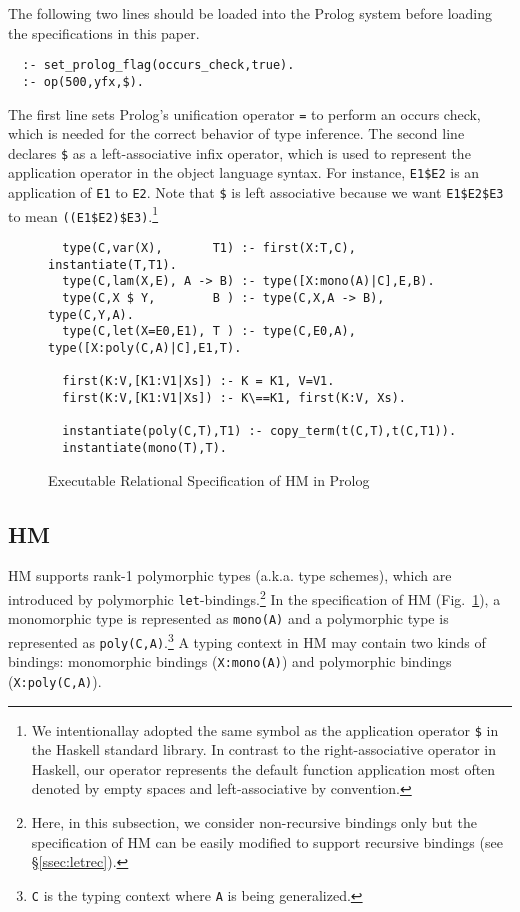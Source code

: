 \documentclass[runningheads,a4paper]{llncs}
\begin{document}
The following two lines should be loaded into the Prolog system
before loading the specifications in this paper. {\small\vspace*{-1ex}
\begin{verbatim}
  :- set_prolog_flag(occurs_check,true).
  :- op(500,yfx,$).
\end{verbatim} \vspace*{-.7ex} }\noindent
The first line sets Prolog's unification operator \verb|=| to perform an
occurs check, which is needed for the correct behavior of type inference.
The second line declares \verb|$| as a left-associative infix operator,
which is used to represent the application operator in the object language
syntax. For instance, {\small\verb|E1$E2|} is an application of
{\small\verb|E1|} to {\small\verb|E2|}. Note that \verb|$| is left associative
because we want \verb|E1$E2$E3| to mean \verb|((E1$E2)$E3)|.\footnote{
	We intentionallay adopted the same symbol as the application operator
	\texttt{\$} in the Haskell standard library. In contrast to the
	right-associative operator in Haskell, our operator represents
	the default function application most often denoted by empty spaces
	and left-associative by convention.}

\begin{figure}[b]
\begin{verbatim}
  type(C,var(X),       T1) :- first(X:T,C), instantiate(T,T1).
  type(C,lam(X,E), A -> B) :- type([X:mono(A)|C],E,B).
  type(C,X $ Y,        B ) :- type(C,X,A -> B), type(C,Y,A).
  type(C,let(X=E0,E1), T ) :- type(C,E0,A), type([X:poly(C,A)|C],E1,T).

  first(K:V,[K1:V1|Xs]) :- K = K1, V=V1.
  first(K:V,[K1:V1|Xs]) :- K\==K1, first(K:V, Xs).
  
  instantiate(poly(C,T),T1) :- copy_term(t(C,T),t(C,T1)).
  instantiate(mono(T),T).
\end{verbatim}
\vspace*{-3ex}
\caption{Executable Relational Specification of HM in Prolog}
\label{fig:HM}
\vspace*{-2ex}
\end{figure}
\subsection{HM}\label{ssec:HM}
HM supports rank-1 polymorphic types (a.k.a. type schemes), which are
introduced by polymorphic \texttt{let}-bindings.\footnote{ Here,
	in this subsection, we consider non-recursive bindings only 
	but the specification of HM can be easily modified to support
	recursive bindings (see \S\ref{ssec:letrec}).}
In the specification of HM (Fig.~\ref{fig:HM}), a monomorphic type is
represented as {\small\verb|mono(A)|} and a polymorphic type is represented as
{\small\verb|poly(C,A)|}.\footnote{ \texttt{C} is the typing context where
				\texttt{A} is being generalized.}
A typing context in HM may contain two kinds of bindings: 
monomorphic bindings ({\small\verb|X:mono(A)|}) and
polymorphic bindings ({\small\verb|X:poly(C,A)|}).
\end{document}
